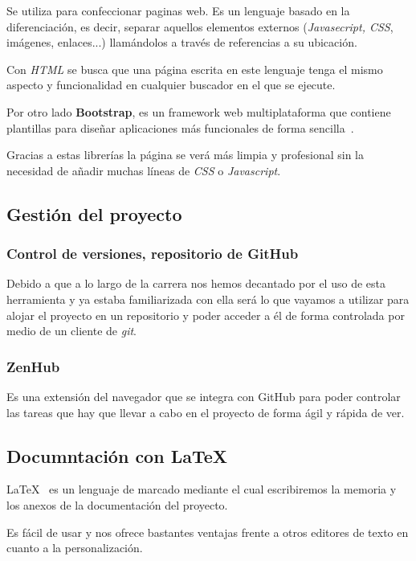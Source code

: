 Se utiliza para confeccionar paginas web. Es un lenguaje basado en la diferenciación, es decir, separar aquellos elementos externos (\textit{Javasecript, CSS}, imágenes, enlaces...) llamándolos a través de referencias a su ubicación.

Con \textit{HTML} se busca que una página escrita en este lenguaje tenga el mismo aspecto y funcionalidad en cualquier buscador en el que se ejecute.

Por otro lado \textbf{Bootstrap}, es un  framework web multiplataforma que contiene plantillas para diseñar aplicaciones más funcionales de forma sencilla~\cite{bootstrap}.

Gracias a estas librerías la página se verá más limpia y profesional sin la necesidad de añadir muchas líneas de \textit{CSS} o \textit{Javascript}.
 

\subsection{Gestión del proyecto}
\subsubsection{Control de versiones, repositorio de GitHub}

Debido a que a lo largo de la carrera nos hemos decantado por el uso de esta herramienta y ya estaba familiarizada con ella será lo que vayamos a utilizar para alojar el proyecto en un repositorio y poder acceder a él de forma controlada por medio de un cliente de \textit{git}.

\subsubsection{ZenHub}
Es una extensión del navegador que se integra con GitHub para poder controlar las tareas que hay que llevar a cabo en el proyecto de forma ágil y rápida de ver.

\subsection{Documntación con \LaTeX{}}
\LaTeX{}~\cite{tex} es un lenguaje de marcado mediante el cual escribiremos la memoria y los anexos de la documentación del proyecto.

Es fácil de usar y nos ofrece bastantes ventajas frente a otros editores de texto en cuanto a la personalización. 

